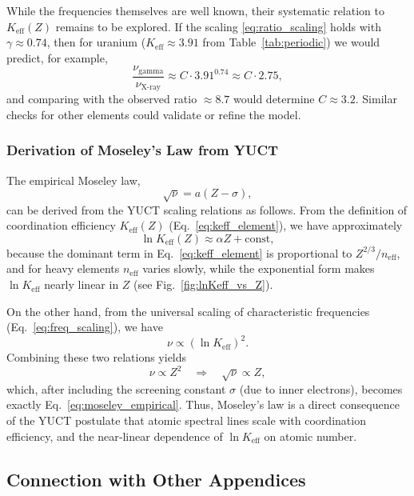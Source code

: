 \documentclass[12pt,a4paper]{article}
\theoremstyle{remark}
\begin{document}
	While the frequencies themselves are well known, their systematic relation to \(K_{\mathrm{eff}}(Z)\) remains to be explored. If the scaling \eqref{eq:ratio_scaling} holds with \(\gamma \approx 0.74\), then for uranium (\(K_{\mathrm{eff}}\approx 3.91\) from Table~\ref{tab:periodic}) we would predict, for example,
	\[
	\frac{\nu_{\text{gamma}}}{\nu_{\text{X-ray}}} \approx C \cdot 3.91^{0.74} \approx C \cdot 2.75,
	\]
	and comparing with the observed ratio \(\approx 8.7\) would determine \(C \approx 3.2\). Similar checks for other elements could validate or refine the model.
	
	\subsubsection{Derivation of Moseley's Law from YUCT}
	\label{sec:moseley_derivation}
	
	The empirical Moseley law,
	\begin{equation}
		\sqrt{\nu} = a (Z - \sigma),
		\label{eq:moseley_empirical}
	\end{equation}
	can be derived from the YUCT scaling relations as follows. From the definition of coordination efficiency \(K_{\mathrm{eff}}(Z)\) (Eq.~\ref{eq:keff_element}), we have approximately
	\[
	\ln K_{\mathrm{eff}}(Z) \approx \alpha Z + \text{const},
	\]
	because the dominant term in Eq.~\ref{eq:keff_element} is proportional to \(Z^{2/3}/n_{\mathrm{eff}}\), and for heavy elements \(n_{\mathrm{eff}}\) varies slowly, while the exponential form makes \(\ln K_{\mathrm{eff}}\) nearly linear in \(Z\) (see Fig.~\ref{fig:lnKeff_vs_Z}). 
	
	On the other hand, from the universal scaling of characteristic frequencies (Eq.~\ref{eq:freq_scaling}), we have
	\[
	\nu \propto (\ln K_{\mathrm{eff}})^2.
	\]
	Combining these two relations yields
	\[
	\nu \propto Z^2 \quad \Longrightarrow \quad \sqrt{\nu} \propto Z,
	\]
	which, after including the screening constant \(\sigma\) (due to inner electrons), becomes exactly Eq.~\ref{eq:moseley_empirical}. Thus, Moseley's law is a direct consequence of the YUCT postulate that atomic spectral lines scale with coordination efficiency, and the near‑linear dependence of \(\ln K_{\mathrm{eff}}\) on atomic number.
	
	\subsection{Connection with Other Appendices}
	
\end{document}
